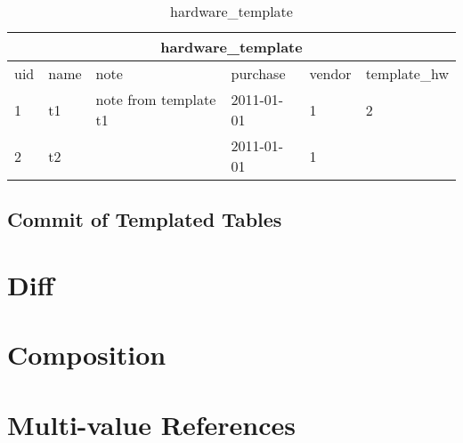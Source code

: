 \documentclass[deska]{subfiles}
\begin{document}
\begin{center}
\begin{table}
    \caption{hardware\_template}
    \label{tab-templ-hwtempl}
\begin{tabular}{ | l | l | l | l | l | l |}
    \hline
    \multicolumn{7}{|c|}{hardware\_template}\\
    \hline
    uid & name & note & purchase & vendor & template\_hw\\
    \hline
    1 & t1 & note from template t1 & 2011-01-01 & 1 & 2\\
    2 & t2 &  & 2011-01-01 & 1 & \\
    \hline
\end{tabular}
\end{table}

\end{center}

\subsection{Commit of Templated Tables}

\section{Diff}

\section{Composition}

\section{Multi-value References}
\end{document}
